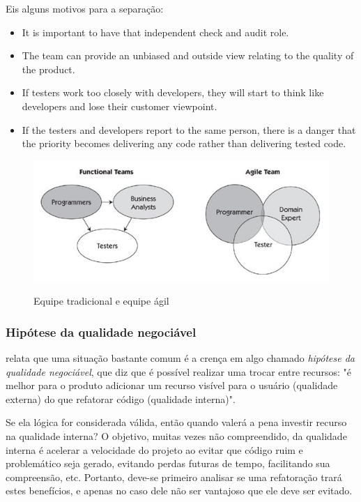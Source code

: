 \documentclass[
	12pt,				%
	openright,			%
	oneside,			%
	a4paper,			%
	english,			%
	brazil,				%
	]{abntex2}
\begin{document}
Eis alguns motivos para a separação:

\begin{itemize}
    \item It is important to have that independent check and audit role.
    \item The team can provide an unbiased and outside view relating to the quality of the product.
    \item If testers work too closely with developers, they will start to think like developers and lose their customer viewpoint.
    \item If the testers and developers report to the same person, there is a danger that the priority becomes delivering any code rather than delivering tested code.
\end{itemize}


\begin{figure}[H]
    \centering
    \caption{Equipe tradicional e equipe ágil}
    \graphicspath{ {./graphics/agile/} }
    \includegraphics[scale=1.0]{functional-and-agile-teams}
    \label{fig:functional-and-agile-teams}
\end{figure}


\subsubsection{Hipótese da qualidade negociável}
 relata que uma situação bastante comum é a crença em algo chamado \emph{hipótese da qualidade negociável}, que diz que é possível realizar uma trocar entre recursos: "é melhor para o produto adicionar um recurso visível para o usuário (qualidade externa) do que refatorar código (qualidade interna)".

Se ela lógica for considerada válida, então quando valerá a pena investir recurso na qualidade interna? O objetivo, muitas vezes não compreendido, da qualidade interna é acelerar a velocidade do projeto ao evitar que código ruim e problemático seja gerado, evitando perdas futuras de tempo, facilitando sua compreensão, etc. Portanto, deve-se primeiro analisar se uma refatoração trará estes benefícios, e apenas no caso dele não ser vantajoso que ele deve ser evitado.
\end{document}

